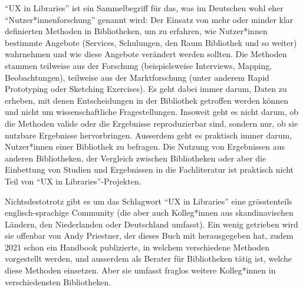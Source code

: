 \documentclass[a4paper,
fontsize=11pt,
oneside,
numbers=noperiodatend,
parskip=half-,
bibliography=totoc,
final
]{scrartcl}
\begin{document}
\enquote{UX in Libraries} ist ein Sammelbegriff für das, was im
Deutschen wohl eher \enquote{Nutzer*innen\-for\-schung} genannt wird: Der
Einsatz von mehr oder minder klar definierten Methoden in Bibliotheken,
um zu erfahren, wie Nutzer*innen bestimmte Angebote (Services,
Schulungen, den Raum Bibliothek und so weiter) wahrnehmen und wie diese
Angebote verändert werden sollten. Die Methoden stammen teilweise aus
der Forschung (beispielsweise Interviews, Mapping, Beobachtungen),
teilweise aus der Marktforschung (unter anderem Rapid Prototyping oder
Sketching Exercises). Es geht dabei immer darum, Daten zu erheben, mit
denen Entscheidungen in der Bibliothek getroffen werden können und nicht
um wissenschaftliche Fragestellungen. Insoweit geht es nicht darum, ob
die Methoden valide oder die Ergebnisse reproduzierbar sind, sondern
nur, ob sie nutzbare Ergebnisse hervorbringen. Ausserdem geht es
praktisch immer darum, Nutzer*innen einer Bibliothek zu befragen. Die
Nutzung von Ergebnissen aus anderen Bibliotheken, der Vergleich zwischen
Bibliotheken oder aber die Einbettung von Studien und Ergebnissen in die
Fachliteratur ist praktisch nicht Teil von \enquote{UX in
Libraries}-Projekten.

Nichtsdestotrotz gibt es um das Schlagwort \enquote{UX in Libraries}
eine grösstenteils englisch-sprachige Community (die aber auch
Kolleg*innen aus skandinavischen Ländern, den Niederlanden oder
Deutschland umfasst). Ein wenig getrieben wird sie offenbar von Andy
Priestner, der dieses Buch mit herausgegeben hat, zudem 2021 schon ein
Handbook publizierte, in welchem verschiedene Methoden vorgestellt
werden, und ausserdem als Berater für Bibliotheken tätig ist, welche
diese Methoden einsetzen. Aber sie umfasst fraglos weitere Kolleg*innen
in verschiedensten Bibliotheken.
\end{document}
